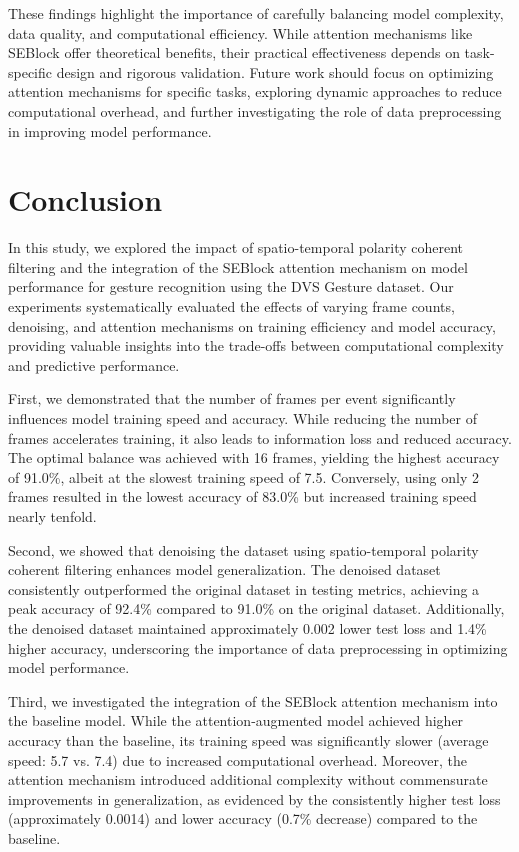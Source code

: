 \documentclass[conference]{IEEEtran}
\begin{document}
These findings highlight the importance of carefully balancing model complexity, data quality, and computational efficiency. While attention mechanisms like SEBlock offer theoretical benefits, their practical effectiveness depends on task-specific design and rigorous validation. Future work should focus on optimizing attention mechanisms for specific tasks, exploring dynamic approaches to reduce computational overhead, and further investigating the role of data preprocessing in improving model performance.

\section{Conclusion}
In this study, we explored the impact of spatio-temporal polarity coherent filtering and the integration of the SEBlock attention mechanism on model performance for gesture recognition using the DVS Gesture dataset. Our experiments systematically evaluated the effects of varying frame counts, denoising, and attention mechanisms on training efficiency and model accuracy, providing valuable insights into the trade-offs between computational complexity and predictive performance.

First, we demonstrated that the number of frames per event significantly influences model training speed and accuracy. While reducing the number of frames accelerates training, it also leads to information loss and reduced accuracy. The optimal balance was achieved with 16 frames, yielding the highest accuracy of 91.0\%, albeit at the slowest training speed of 7.5. Conversely, using only 2 frames resulted in the lowest accuracy of 83.0\% but increased training speed nearly tenfold.

Second, we showed that denoising the dataset using spatio-temporal polarity coherent filtering enhances model generalization. The denoised dataset consistently outperformed the original dataset in testing metrics, achieving a peak accuracy of 92.4\% compared to 91.0\% on the original dataset. Additionally, the denoised dataset maintained approximately 0.002 lower test loss and 1.4\% higher accuracy, underscoring the importance of data preprocessing in optimizing model performance.

Third, we investigated the integration of the SEBlock attention mechanism into the baseline model. While the attention-augmented model achieved higher accuracy than the baseline, its training speed was significantly slower (average speed: 5.7 vs. 7.4) due to increased computational overhead. Moreover, the attention mechanism introduced additional complexity without commensurate improvements in generalization, as evidenced by the consistently higher test loss (approximately 0.0014) and lower accuracy (0.7\% decrease) compared to the baseline.
\end{document}

